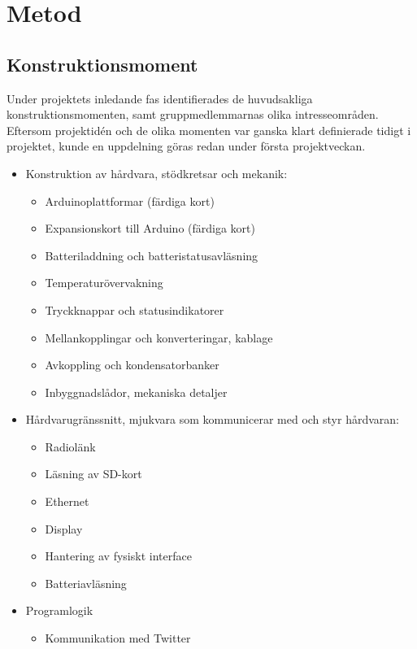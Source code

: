 \documentclass[a4paper,11pt]{article}
\begin{document}
\section{Metod}

\subsection{Konstruktionsmoment}	
Under projektets inledande fas identifierades de huvudsakliga konstruktionsmomenten, samt gruppmedlemmarnas olika intresseområden. Eftersom projektidén och de olika momenten var ganska klart definierade tidigt i projektet, kunde en uppdelning göras redan under första projektveckan.

	\begin{itemize}
	\item Konstruktion av hårdvara, stödkretsar och mekanik:
		\begin{itemize}
        	\item Arduinoplattformar (färdiga kort)
        	\item Expansionskort till Arduino (färdiga kort)
        	\item Batteriladdning och batteristatusavläsning
        	\item Temperaturövervakning
        	\item Tryckknappar och statusindikatorer
        	\item Mellankopplingar och konverteringar, kablage
            \item Avkoppling och kondensatorbanker
        	\item Inbyggnadslådor, mekaniska detaljer
        	\end{itemize}	
    	\item Hårdvarugränssnitt, mjukvara som kommunicerar med och styr hårdvaran:
    		\begin{itemize}
        	\item Radiolänk
        	\item Läsning av SD-kort
        	\item Ethernet
        	\item Display
            \item Hantering av fysiskt interface
            \item Batteriavläsning
        	\end{itemize}
    	\item Programlogik
    		\begin{itemize}
        	\item Kommunikation med Twitter

\end{itemize}
\end{itemize}
\end{document}
